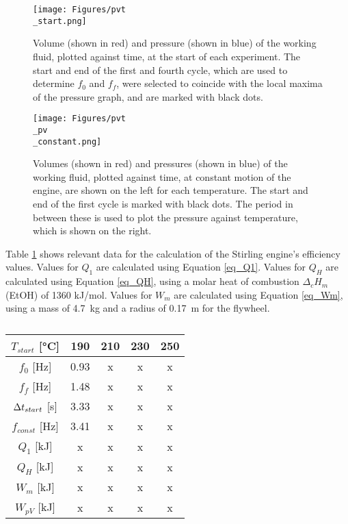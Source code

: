 \documentclass[titlepage]{article}
\begin{document}
\begin{figure}[H]
    \label{fig_start_pvt}
    \centering
    \texttt{[image: Figures/pvt\\\_start.png]}
    \caption{Volume (shown in red) and pressure (shown in blue) of the working fluid, plotted against time, at the start of each experiment. The start and end of the first and fourth cycle, which are used to determine \(f_0\) and \(f_f\), were selected to coincide with the local maxima of the pressure graph, and are marked with black dots.}
\end{figure}

\begin{figure}[H]
    \label{fig_constant_pvt_pv}
    \centering
    \texttt{[image: Figures/pvt\\\_pv\\\_constant.png]}
    \caption{Volumes (shown in red) and pressures (shown in blue) of the working fluid, plotted against time, at constant motion of the engine, are shown on the left for each temperature. The start and end of the first cycle is marked with black dots. The period in between these is used to plot the pressure against temperature, which is shown on the right.}
\end{figure}

Table \ref{tb_efficiency_runs} shows relevant data for the calculation of the Stirling engine's efficiency values. Values for \(Q_1\) are calculated using Equation \ref{eq_Q1}. Values for \(Q_H\) are calculated using Equation \ref{eq_QH}, using a molar heat of combustion \(\Delta_c H_m\)(EtOH) of 1360 kJ/mol. Values for \(W_m\) are calculated using Equation \ref{eq_Wm}, using a mass of 4.7~kg and a radius of 0.17~m for the flywheel.

\begin{table}[H]
    \centering
    \begin{tabular}{|c||c|c|c|c|}
        \hline
        \(T_{start}\) [°C] & \textbf{190} & \textbf{210} & \textbf{230} & \textbf{250}
        \\
        \hline
        \hline
        \(f_0\) [Hz] & 0.93 & x & x & x
        \\
        \hline
        \(f_f\) [Hz] & 1.48 & x & x & x
        \\
        \hline
        \({\adif t}_{start}\) [s] & 3.33 & x & x & x
        \\
        \hline
        \(f_{const}\) [Hz] & 3.41 & x & x & x
        \\
        \hline
        \hline
        \(Q_1\) [kJ] & x & x & x & x
        \\
        \hline
        \(Q_H\) [kJ] & x & x & x & x
        \\
        \hline
        \(W_m\) [kJ] & x & x & x & x
        \\
        \hline
        \(W_{pV}\) [kJ] & x & x & x & x
        \\
        \hline
    \end{tabular}
    \caption{}
    \label{tb_efficiency_runs}
\end{table}

\end{document}
